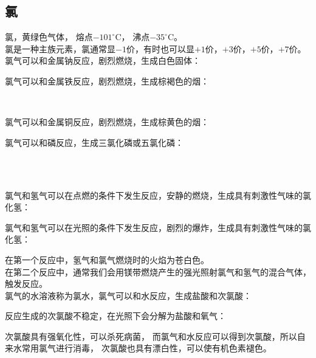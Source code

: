 \documentclass[UTF8]{ctexart}
\begin{document}
\subsection{氯}
    氯，黄绿色气体，
    熔点$-101^\circ$C，
    沸点$-35^\circ$C。\\[3mm]
    氯是一种主族元素，氯通常显$-1$价，有时也可以显$+1$价，$+3$价，$+5$价，$+7$价。\\[5mm]
    氯气可以和金属钠反应，剧烈燃烧，生成白色固体：
    \begin{center}
    \end{center}
    \vspace{5pt}
    氯气可以和金属铁反应，剧烈燃烧，生成棕褐色的烟：
    \begin{center}
        ~~~~
    \end{center}
    \vspace{5pt}
    氯气可以和金属铜反应，剧烈燃烧，生成棕黄色的烟：
    \begin{center}
    \end{center}
    \vspace{10pt}
    氯气可以和磷反应，生成三氯化磷或五氯化磷：
    \begin{center}
        \\[3mm]
        \\[3mm]
    \end{center}
    氯气和氢气可以在点燃的条件下发生反应，安静的燃烧，生成具有刺激性气味的氯化氢：
    \begin{center}
    \end{center}
    \vspace{5pt}
    氯气和氢气可以在光照的条件下发生反应，剧烈的爆炸，生成具有刺激性气味的氯化氢：
    \begin{center}
    \end{center}
    \vspace{5pt}
    在第一个反应中，氢气和氯气燃烧时的火焰为苍白色。\\[3mm]
    在第二个反应中，通常我们会用镁带燃烧产生的强光照射氯气和氢气的混合气体，触发反应。\\[5mm]
    氯气的水溶液称为氯水，氯气可以和水反应，生成盐酸和次氯酸：
    \begin{center}
    \end{center}
    \vspace{5pt}
    反应生成的次氯酸不稳定，在光照下会分解为盐酸和氧气：
    \begin{center}
    \end{center}
    次氯酸具有强氧化性，可以杀死病菌，
    而氯气和水反应可以得到次氯酸，所以自来水常用氯气进行消毒，
    次氯酸也具有漂白性，可以使有机色素褪色。
\end{document}
